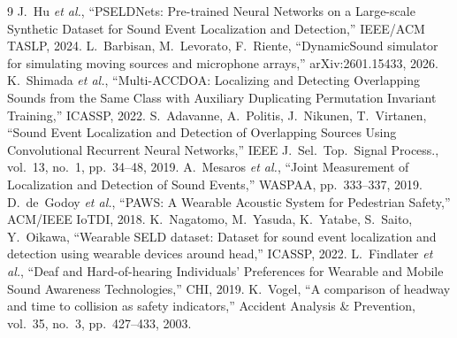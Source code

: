 \documentclass[twocolumn,a4paper,9pt]{jsarticle}
\begin{document}
\begin{thebibliography}{9}\small
{} J.~Hu \textit{et al.},
  ``PSELDNets: Pre-trained Neural Networks on a Large-scale Synthetic Dataset
  for Sound Event Localization and Detection,'' IEEE/ACM TASLP, 2024.
 L.~Barbisan, M.~Levorato, F.~Riente,
  ``DynamicSound simulator for simulating moving sources and microphone arrays,''
  arXiv:2601.15433, 2026.
 K.~Shimada \textit{et al.},
  ``Multi-ACCDOA: Localizing and Detecting Overlapping Sounds from the Same Class
  with Auxiliary Duplicating Permutation Invariant Training,'' ICASSP, 2022.
 S.~Adavanne, A.~Politis, J.~Nikunen, T.~Virtanen,
  ``Sound Event Localization and Detection of Overlapping Sources Using
  Convolutional Recurrent Neural Networks,'' IEEE J.~Sel.~Top.~Signal Process.,
  vol.~13, no.~1, pp.~34--48, 2019.
 A.~Mesaros \textit{et al.},
  ``Joint Measurement of Localization and Detection of Sound Events,''
  WASPAA, pp.~333--337, 2019.
 D.~de~Godoy \textit{et al.},
  ``PAWS: A Wearable Acoustic System for Pedestrian Safety,''
  ACM/IEEE IoTDI, 2018.
 K.~Nagatomo, M.~Yasuda, K.~Yatabe, S.~Saito, Y.~Oikawa,
  ``Wearable SELD dataset: Dataset for sound event localization and detection
  using wearable devices around head,'' ICASSP, 2022.
 L.~Findlater \textit{et al.},
  ``Deaf and Hard-of-hearing Individuals' Preferences for Wearable and Mobile
  Sound Awareness Technologies,'' CHI, 2019.
 K.~Vogel,
  ``A comparison of headway and time to collision as safety indicators,''
  Accident Analysis \& Prevention, vol.~35, no.~3, pp.~427--433, 2003.
\end{thebibliography}
\end{document}

